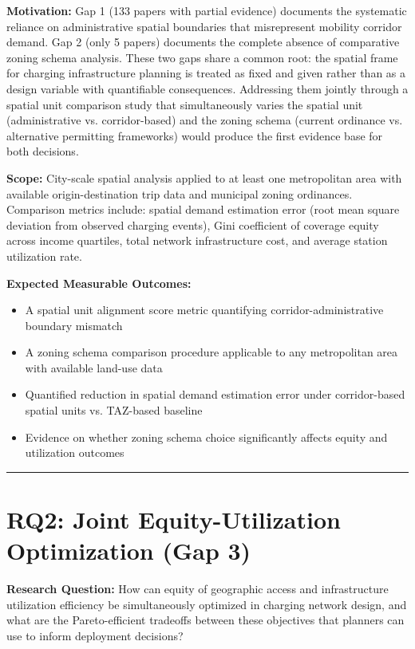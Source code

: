 \documentclass[letterpaper, 12pt, oneside, doublespacing]{Thesis}
\begin{document}
\noindent \textbf{Motivation:} Gap 1 (133 papers with partial evidence) documents the systematic reliance on administrative spatial boundaries that misrepresent mobility corridor demand. Gap 2 (only 5 papers) documents the complete absence of comparative zoning schema analysis. These two gaps share a common root: the spatial frame for charging infrastructure planning is treated as fixed and given rather than as a design variable with quantifiable consequences. Addressing them jointly through a spatial unit comparison study that simultaneously varies the spatial unit (administrative vs. corridor-based) and the zoning schema (current ordinance vs. alternative permitting frameworks) would produce the first evidence base for both decisions.



\noindent \textbf{Scope:} City-scale spatial analysis applied to at least one metropolitan area with available origin-destination trip data and municipal zoning ordinances. Comparison metrics include: spatial demand estimation error (root mean square deviation from observed charging events), Gini coefficient of coverage equity across income quartiles, total network infrastructure cost, and average station utilization rate.



\noindent \textbf{Expected Measurable Outcomes:}

\begin{itemize}
  \item A spatial unit alignment score metric quantifying corridor-administrative boundary mismatch
  \item A zoning schema comparison procedure applicable to any metropolitan area with available land-use data
  \item Quantified reduction in spatial demand estimation error under corridor-based spatial units vs. TAZ-based baseline
  \item Evidence on whether zoning schema choice significantly affects equity and utilization outcomes
\end{itemize}


\bigskip\noindent\rule{\linewidth}{0.4pt}\bigskip


\section{RQ2: Joint Equity-Utilization Optimization (Gap 3)}


\noindent \textbf{Research Question:} How can equity of geographic access and infrastructure utilization efficiency be simultaneously optimized in charging network design, and what are the Pareto-efficient tradeoffs between these objectives that planners can use to inform deployment decisions?
\end{document}
